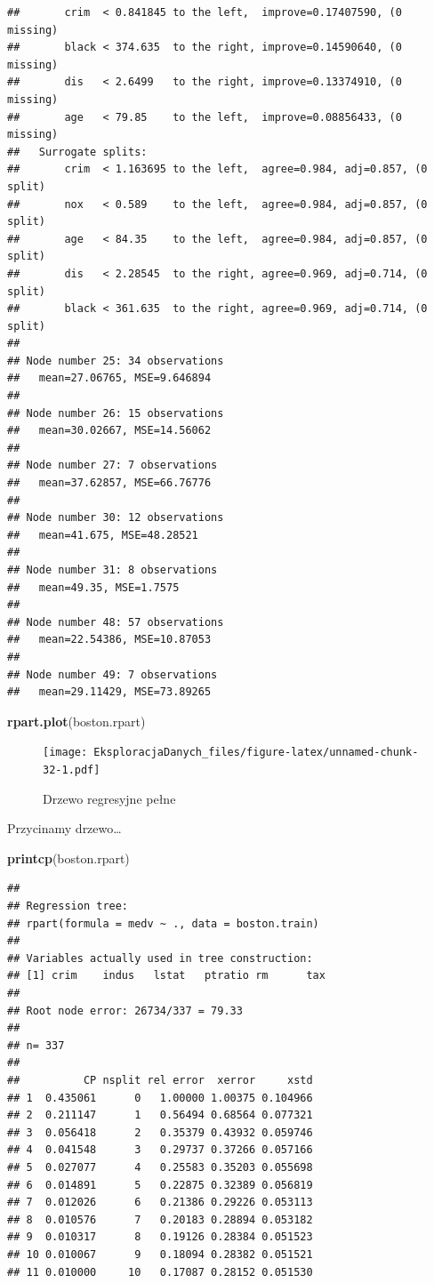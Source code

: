 \documentclass[]{book}
\newenvironment{Shaded}{\begin{snugshade}}{\end{snugshade}}
\newcommand{\KeywordTok}[1]{\textcolor[rgb]{0.13,0.29,0.53}{\textbf{#1}}}
\newcommand{\NormalTok}[1]{#1}
\theoremstyle{plain}
\theoremstyle{definition}
\theoremstyle{definition}
\theoremstyle{definition}
\theoremstyle{definition}
\theoremstyle{remark}
\begin{document}
\begin{verbatim}
##       crim  < 0.841845 to the left,  improve=0.17407590, (0 missing)
##       black < 374.635  to the right, improve=0.14590640, (0 missing)
##       dis   < 2.6499   to the right, improve=0.13374910, (0 missing)
##       age   < 79.85    to the left,  improve=0.08856433, (0 missing)
##   Surrogate splits:
##       crim  < 1.163695 to the left,  agree=0.984, adj=0.857, (0 split)
##       nox   < 0.589    to the left,  agree=0.984, adj=0.857, (0 split)
##       age   < 84.35    to the left,  agree=0.984, adj=0.857, (0 split)
##       dis   < 2.28545  to the right, agree=0.969, adj=0.714, (0 split)
##       black < 361.635  to the right, agree=0.969, adj=0.714, (0 split)
## 
## Node number 25: 34 observations
##   mean=27.06765, MSE=9.646894 
## 
## Node number 26: 15 observations
##   mean=30.02667, MSE=14.56062 
## 
## Node number 27: 7 observations
##   mean=37.62857, MSE=66.76776 
## 
## Node number 30: 12 observations
##   mean=41.675, MSE=48.28521 
## 
## Node number 31: 8 observations
##   mean=49.35, MSE=1.7575 
## 
## Node number 48: 57 observations
##   mean=22.54386, MSE=10.87053 
## 
## Node number 49: 7 observations
##   mean=29.11429, MSE=73.89265
\end{verbatim}

\begin{Shaded}
\begin{Highlighting}[]
\KeywordTok{rpart.plot}\NormalTok{(boston.rpart)}
\end{Highlighting}
\end{Shaded}

\begin{figure}
\centering
\texttt{[image: EksploracjaDanych\_files/figure-latex/unnamed-chunk-32-1.pdf]}
\caption{\label{fig:unnamed-chunk-32}Drzewo regresyjne pełne}
\end{figure}

Przycinamy drzewo\ldots{}

\begin{Shaded}
\begin{Highlighting}[]
\KeywordTok{printcp}\NormalTok{(boston.rpart)}
\end{Highlighting}
\end{Shaded}

\begin{verbatim}
## 
## Regression tree:
## rpart(formula = medv ~ ., data = boston.train)
## 
## Variables actually used in tree construction:
## [1] crim    indus   lstat   ptratio rm      tax    
## 
## Root node error: 26734/337 = 79.33
## 
## n= 337 
## 
##          CP nsplit rel error  xerror     xstd
## 1  0.435061      0   1.00000 1.00375 0.104966
## 2  0.211147      1   0.56494 0.68564 0.077321
## 3  0.056418      2   0.35379 0.43932 0.059746
## 4  0.041548      3   0.29737 0.37266 0.057166
## 5  0.027077      4   0.25583 0.35203 0.055698
## 6  0.014891      5   0.22875 0.32389 0.056819
## 7  0.012026      6   0.21386 0.29226 0.053113
## 8  0.010576      7   0.20183 0.28894 0.053182
## 9  0.010317      8   0.19126 0.28384 0.051523
## 10 0.010067      9   0.18094 0.28382 0.051521
## 11 0.010000     10   0.17087 0.28152 0.051530
\end{verbatim}
\end{document}
